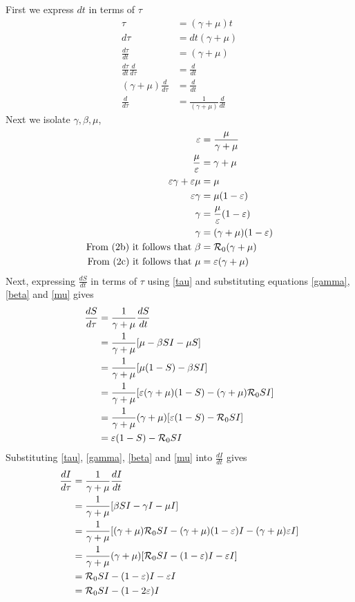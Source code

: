 First we express $dt$ in terms of $\tau$
\begin{align}
    \tau &= (\gamma + \mu)t\nonumber\\
    d\tau &= dt(\gamma + \mu)\nonumber\\
    \frac{d\tau}{dt} &= (\gamma + \mu)\nonumber\\
    \frac{d\tau}{dt}\frac{d}{d\tau} &= \frac{d}{dt}\nonumber\\
    (\gamma+\mu)\frac{d}{d\tau} &= \frac{d}{dt}\nonumber\\
    \frac{d}{d\tau} &= \frac{1}{(\gamma+\mu)}\frac{d}{dt}\label{tau}
\end{align}
Next we isolate $\gamma,\beta,\mu$,
\begin{align}
    \varepsilon &= \frac{\mu}{\gamma+\mu}\nonumber\\
    \frac{\mu}{\varepsilon} &= \gamma+\mu\nonumber\\
    \varepsilon \gamma + \varepsilon \mu &= \mu\nonumber\\
    \varepsilon \gamma &= \mu(1-\varepsilon)\nonumber\\
    \gamma &= \frac{\mu}{\varepsilon}(1-\varepsilon)\nonumber\\
    \gamma &= (\gamma+\mu)(1-\varepsilon)\label{gamma}\\
    \textrm{From (2b) it follows that}\ \beta &= {\mathcal R_0}(\gamma+\mu)\label{beta}\\
    \textrm{From (2c) it follows that}\ \mu &= \varepsilon(\gamma+\mu)\label{mu}
\end{align}
Next, expressing $\frac{dS}{dt}$ in terms of $\tau$ using \ref{tau} and substituting equations \ref{gamma},\ref{beta} and \ref{mu} gives
\begin{align}
    \frac{dS}{d\tau} &= \frac{1}{\gamma+\mu}\frac{dS}{dt}\nonumber\\
     &= \frac{1}{\gamma+\mu}[\mu-\beta SI -\mu S]\nonumber\\
     &= \frac{1}{\gamma+\mu}[\mu(1-S)-\beta SI]\\
     &= \frac{1}{\gamma+\mu}[\varepsilon(\gamma+\mu)(1-S)- (\gamma+\mu){\mathcal R_0}SI]\nonumber\\
     &= \frac{1}{\gamma+\mu}(\gamma+\mu)[\varepsilon(1-S)- {\mathcal R_0}SI]\nonumber\\
     &= \varepsilon(1-S)- {\mathcal R_0}SI
\end{align}
Substituting \ref{tau}, \ref{gamma}, \ref{beta} and \ref{mu} into $\frac{dI}{dt}$ gives
\begin{align}
    \frac{dI}{d\tau} &= \frac{1}{\gamma+\mu}\frac{dI}{dt}\nonumber\\
     &= \frac{1}{\gamma+\mu}[\beta SI -\gamma I-\mu I]\nonumber\\
     &= \frac{1}{\gamma+\mu}[(\gamma+\mu){\mathcal R_0}SI -(\gamma+\mu)(1-\varepsilon) I-(\gamma+\mu)\varepsilon I]\nonumber\\
     &= \frac{1}{\gamma+\mu}(\gamma+\mu)[{\mathcal R_0}SI -(1-\varepsilon) I-\varepsilon I]\nonumber\\
     &= {\mathcal R_0}SI -(1-\varepsilon) I-\varepsilon I\nonumber\\
     &= {\mathcal R_0}SI -(1-2\varepsilon) I
\end{align}
